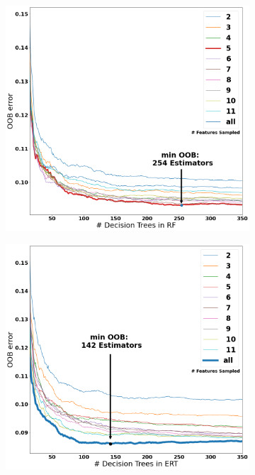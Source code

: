 \documentclass[a4paper, twoside, final, 12pt]{article}
\begin{document}
{\begin{figure}[h]
	\begin{subfigure}{0.48\linewidth}
		\centering
		\includegraphics[scale=0.2]{./src/RF_oob_error}
	\end{subfigure}
	\begin{subfigure}{0.5\linewidth}
		\centering
		\includegraphics[scale=0.2]{./src/ERT_oob_error}

\end{subfigure}
\end{figure}}
\end{document}
